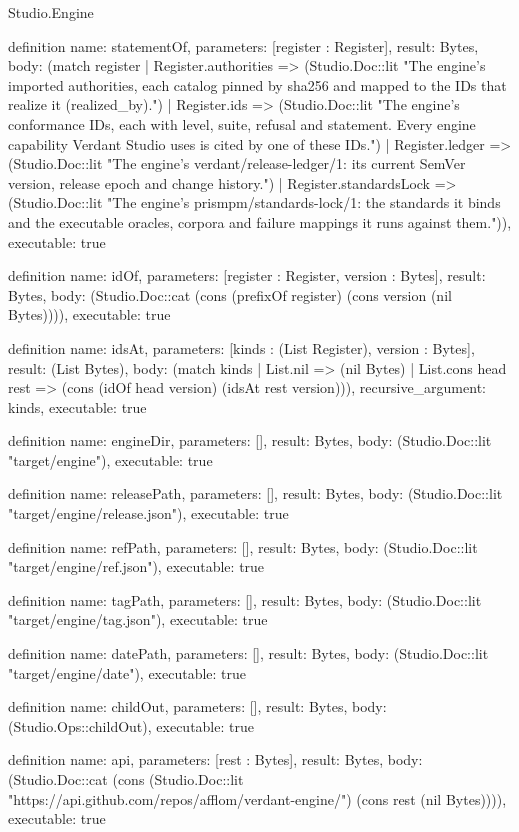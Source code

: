 \begin{lexlean}{Studio.Engine}
\begin{semanticmodule}
definition{
  name: statementOf,
  parameters: [register : Register],
  result: Bytes,
  body: (match register
    | Register.authorities => (Studio.Doc::lit "The engine's imported authorities, each catalog pinned by sha256 and mapped to the IDs that realize it (realized_by).")
    | Register.ids => (Studio.Doc::lit "The engine's conformance IDs, each with level, suite, refusal and statement. Every engine capability Verdant Studio uses is cited by one of these IDs.")
    | Register.ledger => (Studio.Doc::lit "The engine's verdant/release-ledger/1: its current SemVer version, release epoch and change history.")
    | Register.standardsLock => (Studio.Doc::lit "The engine's prismpm/standards-lock/1: the standards it binds and the executable oracles, corpora and failure mappings it runs against them.")),
  executable: true
}

definition{
  name: idOf,
  parameters: [register : Register, version : Bytes],
  result: Bytes,
  body: (Studio.Doc::cat (cons (prefixOf register) (cons version (nil Bytes)))),
  executable: true
}

definition{
  name: idsAt,
  parameters: [kinds : (List Register), version : Bytes],
  result: (List Bytes),
  body: (match kinds
    | List.nil => (nil Bytes)
    | List.cons head rest => (cons (idOf head version) (idsAt rest version))),
  recursive_argument: kinds,
  executable: true
}

definition{
  name: engineDir,
  parameters: [],
  result: Bytes,
  body: (Studio.Doc::lit "target/engine"),
  executable: true
}

definition{
  name: releasePath,
  parameters: [],
  result: Bytes,
  body: (Studio.Doc::lit "target/engine/release.json"),
  executable: true
}

definition{
  name: refPath,
  parameters: [],
  result: Bytes,
  body: (Studio.Doc::lit "target/engine/ref.json"),
  executable: true
}

definition{
  name: tagPath,
  parameters: [],
  result: Bytes,
  body: (Studio.Doc::lit "target/engine/tag.json"),
  executable: true
}

definition{
  name: datePath,
  parameters: [],
  result: Bytes,
  body: (Studio.Doc::lit "target/engine/date"),
  executable: true
}

definition{
  name: childOut,
  parameters: [],
  result: Bytes,
  body: (Studio.Ops::childOut),
  executable: true
}

definition{
  name: api,
  parameters: [rest : Bytes],
  result: Bytes,
  body: (Studio.Doc::cat (cons (Studio.Doc::lit "https://api.github.com/repos/afflom/verdant-engine/") (cons rest (nil Bytes)))),
  executable: true
}


\end{semanticmodule}
\end{lexlean}
